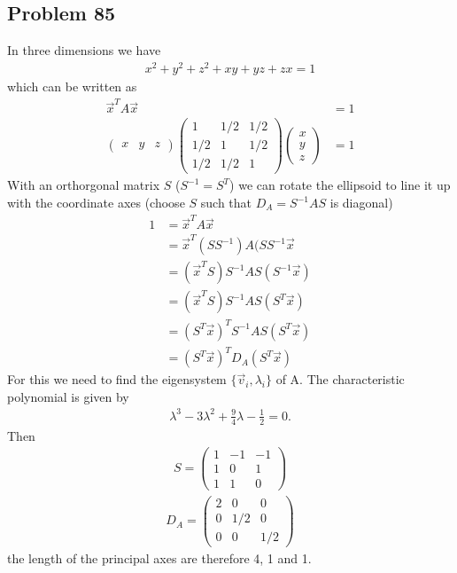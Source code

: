 \documentclass[../main.tex]{subfiles}
\begin{document}
\subsection{Problem 85}
In three dimensions we have
\begin{align}
    x^2+y^2+z^2+xy+yz+zx=1
\end{align}
which can be written as
\begin{align}
\vec{x}^TA\vec{x}&=1\\
\begin{pmatrix}
x & y & z
\end{pmatrix}
\begin{pmatrix}
1 & 1/2 & 1/2\\
1/2 & 1 & 1/2\\
1/2 & 1/2 & 1
\end{pmatrix}
\begin{pmatrix}
x\\
y\\
z
\end{pmatrix}&=1
\end{align}
With an orthorgonal matrix $S$ ($S^{-1}=S^T$) we can rotate the ellipsoid to line it up with the coordinate axes (choose $S$ such that $D_A=S^{-1}AS$ is diagonal)
\begin{align}
1&=\vec{x}^TA\vec{x}\\
&=\vec{x}^T(SS^{-1})A(SS^{-1}\vec{x}\\
&=(\vec{x}^TS)S^{-1}AS(S^{-1}\vec{x})\\
&=(\vec{x}^TS)S^{-1}AS(S^T\vec{x})\\
&=(S^T\vec{x})^TS^{-1}AS(S^T\vec{x})\\
&=(S^T\vec{x})^TD_A(S^T\vec{x})
\end{align}
For this we need to find the eigensystem $\{\vec{v}_i,\lambda_i\}$ of A. The characteristic polynomial is given by
\begin{align}
    \lambda^3-3\lambda^2+\frac{9}{4}\lambda-\frac{1}{2}=0.
\end{align}
Then
\begin{align}
S=\begin{pmatrix}
1 & -1&-1\\
1 & 0 & 1\\
1 & 1 & 0
\end{pmatrix}
\end{align}
\begin{align}
D_A=\begin{pmatrix}
2 & 0   & 0\\
0 & 1/2 & 0\\
0 & 0   & 1/2
\end{pmatrix}
\end{align}
the length of the principal axes are therefore 4, 1 and 1.
\end{document}
